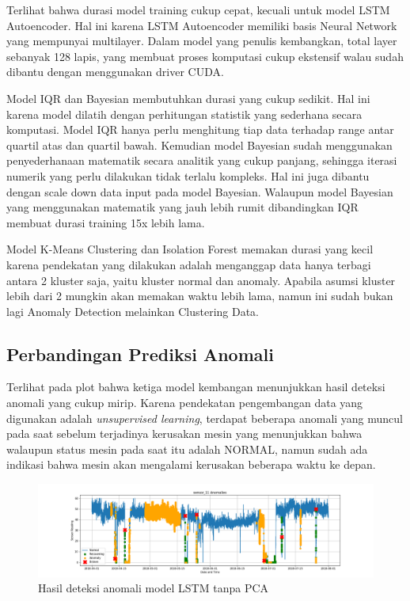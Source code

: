 Terlihat bahwa durasi model training cukup cepat, kecuali untuk model LSTM Autoencoder. Hal ini karena LSTM Autoencoder memiliki basis Neural Network yang mempunyai multilayer. Dalam model yang penulis kembangkan, total layer sebanyak 128 lapis, yang membuat proses komputasi cukup ekstensif walau sudah dibantu dengan menggunakan driver CUDA.

Model IQR dan Bayesian membutuhkan durasi yang cukup sedikit. Hal ini karena model dilatih dengan perhitungan statistik yang sederhana secara komputasi. Model IQR hanya perlu menghitung tiap data terhadap range antar quartil atas dan quartil bawah. Kemudian model Bayesian sudah menggunakan penyederhanaan matematik secara analitik yang cukup panjang, sehingga iterasi numerik yang perlu dilakukan tidak terlalu kompleks. Hal ini juga dibantu dengan scale down data input pada model Bayesian. Walaupun model Bayesian yang menggunakan matematik yang jauh lebih rumit dibandingkan IQR membuat durasi training 15x lebih lama.

Model K-Means Clustering dan Isolation Forest memakan durasi yang kecil karena pendekatan yang dilakukan adalah menganggap data hanya terbagi antara 2 kluster saja, yaitu kluster normal dan anomaly. Apabila asumsi kluster lebih dari 2 mungkin akan memakan waktu lebih lama, namun ini sudah bukan lagi Anomaly Detection melainkan Clustering Data.

    \subsection{Perbandingan Prediksi Anomali}
    Terlihat pada plot bahwa ketiga model kembangan menunjukkan hasil deteksi anomali yang cukup mirip. Karena pendekatan pengembangan data yang digunakan adalah \textit{unsupervised learning}, terdapat beberapa anomali yang muncul pada saat sebelum terjadinya kerusakan mesin yang menunjukkan bahwa walaupun status mesin pada saat itu adalah NORMAL, namun sudah ada indikasi bahwa mesin akan mengalami kerusakan beberapa waktu ke depan.

    \begin{figure}[h]
        \centerline{\includegraphics[width=1.4\textwidth]{resources/LSTM/LSTM_noPCA_sensor_11.png}}
        \caption{Hasil deteksi anomali model LSTM tanpa PCA}
    \end{figure}
    
